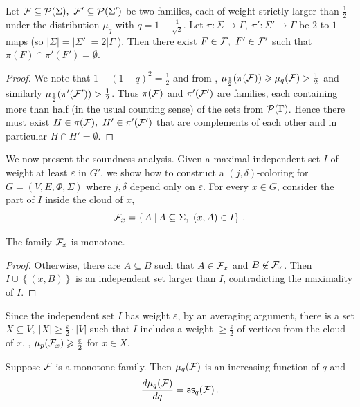 \documentclass{toc}
\newcommand\sett[2]{\left\{ \left. #1 \;\right\vert #2 \right\}}
\newcommand\set[1]{{\left\{ #1 \right\}}}
\newcommand\eps{\varepsilon}
\renewcommand\geq{\geqslant}
\begin{document}
\begin{lemma}\label{lem:aux-2}  Let ${\cal F}\subseteq {\cal P}(\Sigma), ~{\cal F}' \subseteq {\cal P}(\Sigma')$ be two families, each of weight strictly larger than
$\frac{1}{2}$ under the distribution $\mu_q$ with $q = 1-\frac{1}{\sqrt{2}}$. Let $\pi: \Sigma \to \Gamma, ~\pi': \Sigma' \to \Gamma$ be
$2$-to-$1$ maps (so $|\Sigma| = |\Sigma'| = 2|\Gamma|$).
Then there exist $F \in {\cal F},
~F' \in {\cal F}'$ such that $\pi(F) \cap \pi'(F') = \emptyset$.
\end{lemma}
\begin{proof} We note that $1-(1-q)^2 = \frac{1}{2}$ and from , $\mu_{\frac{1}{2}} (\pi({\cal F})) \geq \mu_q ({\cal F}) >
\frac{1}{2}$ and similarly $\mu_{\frac{1}{2}} (\pi'({\cal F}')) > \frac{1}{2}$. Thus $\pi({\cal F})$ and  $\pi'({\cal F}')$ are families,
each containing more than half (in the usual counting sense) of the sets from ${\cal P}(\Gamma)$. Hence there must exist $H \in \pi({\cal F}),
~H' \in \pi'({\cal F}')$ that are complements of each other and in particular $H \cap H' = \emptyset$.
\end{proof}



We now present the soundness analysis. Given
 a maximal independent set $I$ of weight at least $\eps$ in $G'$, we show how to construct
a $(j,\delta)$-coloring for $G=(V,E,\Phi,\Sigma)$ where $j,\delta$ depend only on $\eps$.
For every $x\in G$, consider the part of $I$ inside the cloud of $x$,
\[
{\cal F}_x=\sett{A}{A \subseteq \Sigma, ~(x,A)\in I}\,.%
\]
\begin{claim}
The family ${\cal F}_x$ is monotone.
\end{claim}
\begin{proof}
Otherwise, there are $A\subseteq B$ such that $A\in {\cal F}_x$ and $B\not\in{\cal F}_x$.
Then $I\cup\set{(x,B)}$ is an independent set larger than $I$,  contradicting  the maximality
of $I$.
\end{proof}

Since the independent set $I$ has weight $\eps$, by an averaging argument, there is a set
$X \subseteq V, ~|X| \geqslant \frac{\eps}{2} \cdot |V|$ such that $I$ includes a weight
$\geqslant \frac{\eps}{2}$ of vertices from the cloud of $x$, \ie, $\mu_p({\cal F}_x) \geqslant  \frac{\eps}{2}$
for $x \in X$.



\begin{theorem}
Suppose ${\cal F}$ is a monotone family. Then $\mu_q({\cal F})$ is an increasing function of $q$ and
\[
\frac{d\mu_q({\cal F})}{dq}={\sf as}_q({\cal F})\,.%
\]
\end{theorem}
\end{document}
